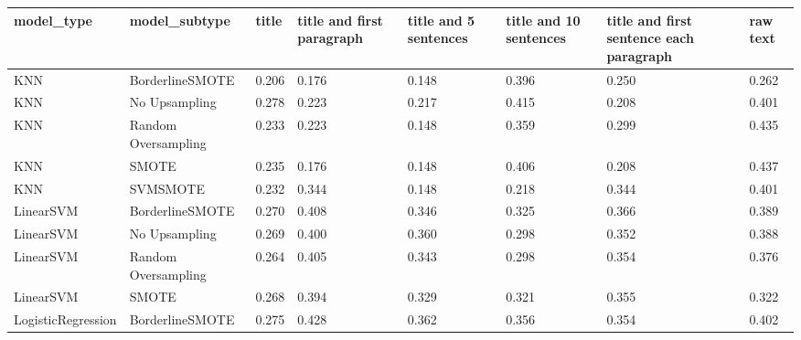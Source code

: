 \begin{tabular}{llllllll}
\toprule
                  model\_type &       model\_subtype & title & title and first paragraph & title and 5 sentences & title and 10 sentences & title and first sentence each paragraph &  raw text \\
\midrule
                         KNN &     BorderlineSMOTE & 0.206 &                     0.176 &                 0.148 &                  0.396 &                                   0.250 &     0.262 \\
                         KNN &       No Upsampling & 0.278 &                     0.223 &                 0.217 &                  0.415 &                                   0.208 &     0.401 \\
                         KNN & Random Oversampling & 0.233 &                     0.223 &                 0.148 &                  0.359 &                                   0.299 &     0.435 \\
                         KNN &               SMOTE & 0.235 &                     0.176 &                 0.148 &                  0.406 &                                   0.208 &     0.437 \\
                         KNN &            SVMSMOTE & 0.232 &                     0.344 &                 0.148 &                  0.218 &                                   0.344 &     0.401 \\
                   LinearSVM &     BorderlineSMOTE & 0.270 &                     0.408 &                 0.346 &                  0.325 &                                   0.366 &     0.389 \\
                   LinearSVM &       No Upsampling & 0.269 &                     0.400 &                 0.360 &                  0.298 &                                   0.352 &     0.388 \\
                   LinearSVM & Random Oversampling & 0.264 &                     0.405 &                 0.343 &                  0.298 &                                   0.354 &     0.376 \\
                   LinearSVM &               SMOTE & 0.268 &                     0.394 &                 0.329 &                  0.321 &                                   0.355 &     0.322 \\
          LogisticRegression &     BorderlineSMOTE & 0.275 &                     0.428 &                 0.362 &                  0.356 &                                   0.354 &     0.402 \\

\end{tabular}
